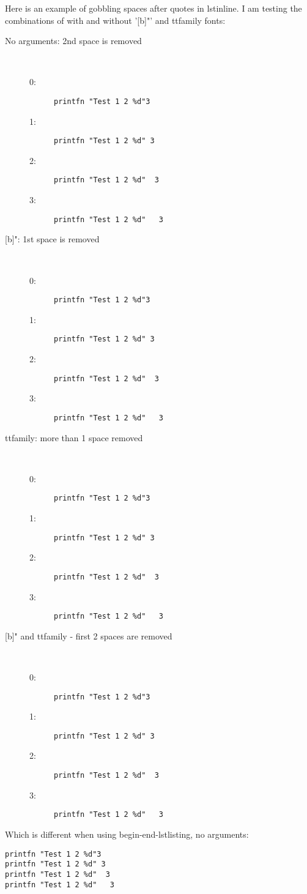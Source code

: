 \documentclass{article}
\begin{document}
\noindent Here is an example of gobbling spaces after quotes in lstinline. I am testing the combinations of with and without '[b]"' and ttfamily fonts:

\begin{description}
\item[No arguments: 2nd space is removed]~\\
  \begin{description}
  \item[0:] \lstinline!printfn "Test 1 2 %d"3!
  \item[1:] \lstinline!printfn "Test 1 2 %d" 3!
  \item[2:] \lstinline!printfn "Test 1 2 %d"  3!
  \item[3:] \lstinline!printfn "Test 1 2 %d"   3!
  \end{description}
\item[{[b]"}: 1st space is removed]~\\
  \begin{description}
  \item[0:] \lstinline[morestring={[b]"}]!printfn "Test 1 2 %
  \item[1:] \lstinline[morestring={[b]"}]!printfn "Test 1 2 %
  \item[2:] \lstinline[morestring={[b]"}]!printfn "Test 1 2 %
  \item[3:] \lstinline[morestring={[b]"}]!printfn "Test 1 2 %
  \end{description}
\item[ttfamily: more than 1 space removed]~\\
  \begin{description}
  \item[0:] \lstinline[basicstyle=\ttfamily]!printfn "Test 1 2 %d"3!
  \item[1:] \lstinline[basicstyle=\ttfamily]!printfn "Test 1 2 %d" 3!
  \item[2:] \lstinline[basicstyle=\ttfamily]!printfn "Test 1 2 %d"  3!
  \item[3:] \lstinline[basicstyle=\ttfamily]!printfn "Test 1 2 %d"   3!
  \end{description}
\item[{[b]"} and ttfamily - first 2 spaces are removed]~\\
  \begin{description}
  \item[0:] \lstinline[morestring={[b]"},basicstyle=\ttfamily]!printfn "Test 1 2 %
  \item[1:] \lstinline[morestring={[b]"},basicstyle=\ttfamily]!printfn "Test 1 2 %
  \item[2:] \lstinline[morestring={[b]"},basicstyle=\ttfamily]!printfn "Test 1 2 %
  \item[3:] \lstinline[morestring={[b]"},basicstyle=\ttfamily]!printfn "Test 1 2 %
  \end{description}
\end{description}
Which is different when using begin-end-lstlisting, no arguments:
\begin{lstlisting}
printfn "Test 1 2 %d"3
printfn "Test 1 2 %d" 3
printfn "Test 1 2 %d"  3 
printfn "Test 1 2 %d"   3 
\end{lstlisting}
\end{document}
